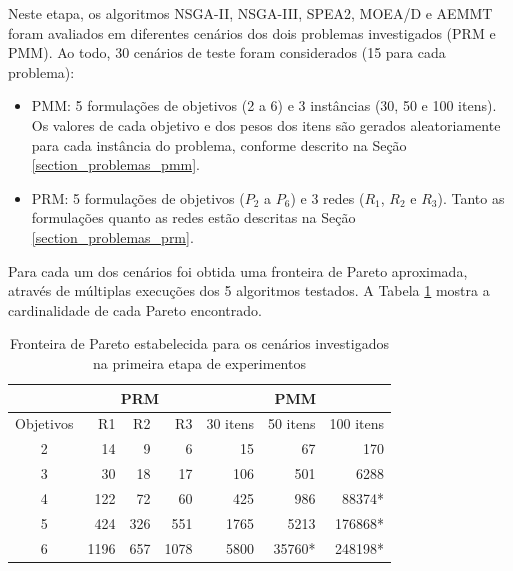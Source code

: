 Neste etapa, os algoritmos NSGA-II, NSGA-III, SPEA2, MOEA/D e AEMMT foram avaliados em diferentes cenários dos dois problemas investigados (PRM e PMM). Ao todo, 30 cenários de teste foram considerados (15 para cada problema):

\begin{itemize}
	\item PMM: 5 formulações de objetivos (2 a 6) e 3 instâncias (30, 50 e 100 itens). Os valores de cada objetivo e dos pesos dos itens são gerados aleatoriamente para cada instância do problema, conforme descrito na Seção \ref{section_problemas_pmm}.
	\item PRM: 5 formulações de objetivos ($P_2$ a $P_6$) e 3 redes ($R_1$, $R_2$ e $R_3$). Tanto as formulações quanto as redes estão descritas na Seção \ref{section_problemas_prm}.
\end{itemize}

Para cada um dos cenários foi obtida uma fronteira de Pareto aproximada, através de múltiplas execuções dos 5 algoritmos testados. A Tabela \ref{table_exp1_paretos} mostra a cardinalidade de cada Pareto encontrado.

\begin{table}[!htbp]
	\centering
	\caption{Fronteira de Pareto estabelecida para os cenários investigados na primeira etapa de experimentos}
	\label{table_exp1_paretos}
	\begin{tabular}{c|rrr|rrr}
		& \multicolumn{3}{c|}{\textbf{PRM}} & \multicolumn{3}{c}{\textbf{PMM}} \\ \hline
		Objetivos & R1         & R2       & R3        & 30 itens  & 50 itens & 100 itens \\ \hline
		2         & 14         & 9        & 6         & 15        & 67       & 170       \\
		3         & 30         & 18       & 17        & 106       & 501      & 6288      \\
		4         & 122        & 72       & 60        & 425       & 986      & 88374*    \\
		5         & 424        & 326      & 551       & 1765      & 5213     & 176868*   \\
		6         & 1196       & 657      & 1078      & 5800      & 35760*   & 248198*   \\ \hline
	\end{tabular}
\end{table}

